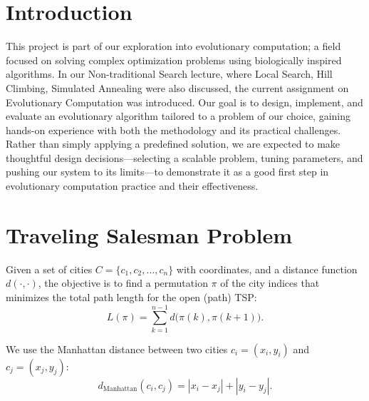 \documentclass{scrartcl}
\title{\reportname}
\subtitle{An Evolutionary Algorithm for the Traveling Salesman Problem}
\author{\docauthor}
\date{\today}
\begin{document}
\maketitle



\section{Introduction}
This project is part of our exploration into evolutionary computation; a field focused on solving complex optimization problems using biologically inspired algorithms. In our Non-traditional Search lecture, where Local Search, Hill Climbing, Simulated Annealing were also discussed, the current assignment on Evolutionary Computation was introduced. 
Our goal is to design, implement, and evaluate an evolutionary algorithm tailored to a problem of our choice, gaining hands-on experience with both the methodology and its practical challenges.
Rather than simply applying a predefined solution, we are expected to make thoughtful design decisions—selecting a scalable problem, tuning parameters, and pushing our system to its limits—to demonstrate it as a good first step in evolutionary computation practice and their effectiveness.


\section{Traveling Salesman Problem}

Given a set of cities \(C=\{c_1,c_2,\dots,c_n\}\) with coordinates, and a distance function \(d(\cdot,\cdot)\), the objective is to find a permutation \(\pi\) of the city indices that minimizes the total path length for the open (path) TSP:
\[
L(\pi)=\sum_{k=1}^{n-1} d\bigl(\pi(k),\pi(k+1)\bigr).
\]

We use the Manhattan distance between two cities \(c_i=(x_i,y_i)\) and \(c_j=(x_j,y_j)\):
\[
d_{\text{Manhattan}}(c_i,c_j)=|x_i-x_j|+|y_i-y_j|.
\]
\end{document}

